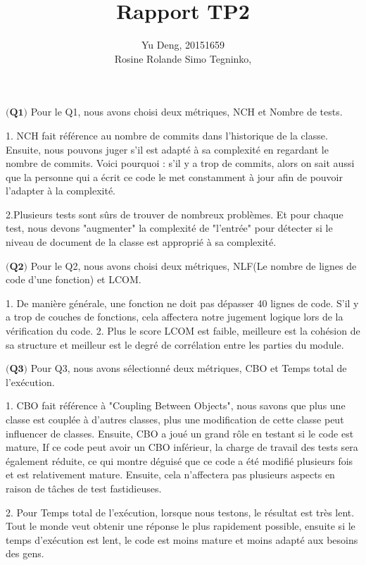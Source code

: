 \documentclass{article}
\title{Rapport TP2}
\author{Yu Deng, 20151659\\Rosine Rolande Simo Tegninko, }
\date{}
\begin{document}
\maketitle

\item {}

\item$\textbf{(Q1)}$
Pour le Q1, nous avons choisi deux métriques, NCH et Nombre de tests.

1.	NCH fait référence au nombre de commits dans l'historique de la classe. Ensuite, nous pouvons juger s'il est adapté à sa complexité en regardant le nombre de commits. Voici pourquoi : s'il y a trop de commits, alors on sait aussi que la personne qui a écrit ce code le met constamment à jour afin de pouvoir l'adapter à la complexité.

2.Plusieurs tests sont sûrs de trouver de nombreux problèmes. Et pour chaque test, nous devons "augmenter" la complexité de "l'entrée" pour détecter si le niveau de document de la classe est approprié à sa complexité.


\item $\textbf{(Q2)}$
Pour le Q2, nous avons choisi deux métriques, NLF(Le nombre de lignes de code d’une fonction) et LCOM.

1. De manière générale, une fonction ne doit pas dépasser 40 lignes de code. S'il y a trop de couches de fonctions, cela affectera notre jugement logique lors de la vérification du code.
2. Plus le score LCOM est faible, meilleure est la cohésion de sa structure et meilleur est le degré de corrélation entre les parties du module.


\item$\textbf{(Q3)}$
Pour Q3, nous avons sélectionné deux métriques, CBO et Temps total de l’exécution.


1. CBO fait référence à "Coupling Between Objects", nous savons que plus une classe est couplée à d'autres classes, plus une modification de cette classe peut influencer de classes. Ensuite, CBO a joué un grand rôle en testant si le code est mature, If ce code peut avoir un CBO inférieur, la charge de travail des tests sera également réduite, ce qui montre déguisé que ce code a été modifié plusieurs fois et est relativement mature. Ensuite, cela n'affectera pas plusieurs aspects en raison de tâches de test fastidieuses.

2. Pour Temps total de l’exécution, lorsque nous testons, le résultat est très lent. Tout le monde veut obtenir une réponse le plus rapidement possible, ensuite si le temps d'exécution est lent, le code est moins mature et moins adapté aux besoins des gens.
\end{document}
